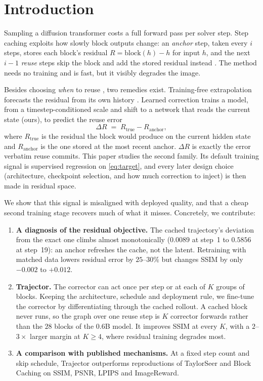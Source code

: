 \documentclass[conference,compsoc]{IEEEtran}
\newcommand{\dR}{\Delta R}
\newcommand{\ourmethod}{Trajector}
\begin{document}
\section{Introduction}

Sampling a diffusion transformer \cite{peebles2023dit} costs a full forward
pass per solver step. Step caching exploits how slowly block outputs change: an
\emph{anchor} step, taken every $i$ steps, stores each block's residual
$R=\mathrm{block}(h)-h$ for input $h$, and
the next $i-1$ \emph{reuse} steps skip the block and add the stored residual
instead \cite{ma2024deepcache,selvaraju2024fora,chen2024deltadit}. The method needs no training and is fast, but it visibly degrades the image.

Besides choosing \emph{when} to reuse \cite{liu2024teacache,kahatapitiya2024adacache}, two remedies exist. Training-free extrapolation forecasts the residual from its own history \cite{liu2025taylorseer}. Learned correction trains a model, from a timestep-conditioned scale and shift \cite{wimbauer2024blockcaching} to a network that reads the current state (ours), to predict the reuse error
\begin{equation}
\dR \;=\; R_{\text{true}} - R_{\text{anchor}},
\label{eq:target}
\end{equation}
where $R_{\text{true}}$ is the residual the block would produce on the
current hidden state and $R_{\text{anchor}}$ is the one stored at the most
recent anchor. $\dR$ is exactly the error verbatim reuse commits. This paper studies the
second family. Its default training signal is supervised regression on
\eqref{eq:target}, and every later design choice (architecture, checkpoint selection, and how much correction to inject) is then made in residual space.

We show that this signal is misaligned with deployed quality, and that a cheap second training stage recovers much of what it misses. Concretely, we contribute:

\begin{enumerate}
\item \textbf{A diagnosis of the residual objective.} The cached trajectory's
deviation from the exact one climbs almost monotonically ($0.0089$ at
step~1 to $0.5856$ at step~19): an anchor refreshes the cache, not the
latent. Retraining
with matched data lowers residual error by $25$--$30\%$ but changes SSIM by
only $-0.002$ to $+0.012$.
\item \textbf{\ourmethod{}.} The corrector can act once per step or at each of
$K$ groups of blocks. Keeping the architecture, schedule and deployment rule,
we fine-tune the corrector by differentiating through the cached rollout. A
cached block never runs, so the graph over one reuse step is $K$ corrector forwards rather than the $28$ blocks of the $0.6$B model. It improves SSIM at every $K$, with a $2$--$3\times$ larger margin at $K{\ge}4$, where residual training degrades most.
\item \textbf{A comparison with published mechanisms.} At a fixed step count and
skip schedule, \ourmethod{} outperforms reproductions of TaylorSeer and Block
Caching on SSIM, PSNR, LPIPS and ImageReward.
\end{enumerate}
\end{document}
